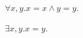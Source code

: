 \begin{proposition}\label{formula_test_forall}
    $\forall x, y. x = x\land y = y$.
\end{proposition}

\begin{proposition}\label{formula_test_exists}
    $\exists x, y. x = y$.
\end{proposition}
